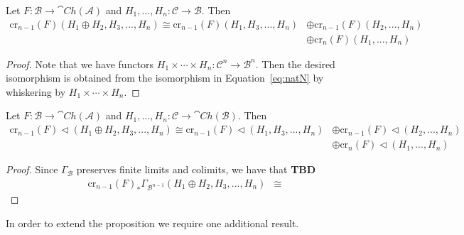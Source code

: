 \begin{lem}[label=lem:dirComp]
    Let $F:\mathcal{B}\to \cat{Ch}(\mathcal{A})$ and $H_1,...,H_n:\mathcal{C}\to \mathcal{B}$. Then 
    \begin{align*}
        \text{cr}_{n-1}(F)(H_1\oplus H_2,H_3,...,H_n) \cong \text{cr}_{n-1}(F)(H_1,H_3,...,H_n)&\oplus \text{cr}_{n-1}(F)(H_2,...,H_n) \\
        &\oplus \text{cr}_n(F)(H_1,...,H_n) 
    \end{align*}
\end{lem}
\begin{proof}
    Note that we have functors $H_1\times \cdots \times H_n:\mathcal{C}^n\to \mathcal{B}^n$. Then the desired isomorphism is obtained from the isomorphism in Equation~\eqref{eq:natN} by whiskering by $H_1\times \cdots \times H_n$.
\end{proof}

\begin{lem}[label=lem:dirCompLhd]
    Let $F:\mathcal{B}\to \cat{Ch}(\mathcal{A})$ and $H_1,...,H_n:\mathcal{C}\to \cat{Ch}(\mathcal{B})$. Then 
    \begin{align*}
        \text{cr}_{n-1}(F)\lhd (H_1\oplus H_2,H_3,...,H_n) \cong \text{cr}_{n-1}(F)\lhd (H_1,H_3,...,H_n)&\oplus \text{cr}_{n-1}(F)\lhd (H_2,...,H_n) \\
        &\oplus \text{cr}_n(F)\lhd (H_1,...,H_n) 
    \end{align*}
\end{lem}
\begin{proof}
    Since $\Gamma_\mathcal{B}$ preserves finite limits and colimits, we have that \textbf{TBD}
    \begin{align*}
        \text{cr}_{n-1}(F)_*\Gamma_{\mathcal{B}^{n-1}}(H_1\oplus H_2,H_3,...,H_n) &\cong 
    \end{align*}
\end{proof}

In order to extend the proposition we require one additional result.


